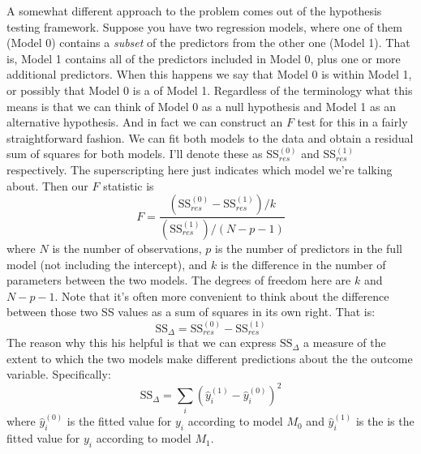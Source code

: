 A somewhat different approach to the problem comes out of the hypothesis testing framework. Suppose you have two regression models, where one of them (Model 0) contains a {\it subset} of the predictors from the other one (Model 1). That is, Model 1 contains all of the predictors included in Model 0, plus one or more additional predictors. When this happens we say that Model 0 is  within Model 1, or possibly that Model 0 is a  of Model 1. Regardless of the terminology what this means is that we can think of Model 0 as a null hypothesis and Model 1 as an alternative hypothesis. And in fact we can construct an $F$ test for this in a fairly straightforward fashion. We can fit both models to the data and obtain a residual sum of squares for both models. I'll denote these as SS$_{res}^{(0)}$ and SS$_{res}^{(1)}$ respectively. The superscripting here just indicates which model we're talking about.  Then our $F$ statistic is
$$
F = \frac{(\mbox{SS}_{res}^{(0)} - \mbox{SS}_{res}^{(1)})/k}{(\mbox{SS}_{res}^{(1)})/(N-p-1)}
$$
where $N$ is the number of observations, $p$ is the number of predictors in the full model (not including the intercept), and $k$ is the difference in the number of parameters between the two models. The degrees of freedom here are $k$ and $N-p-1$. Note that it's often more convenient to think about the difference between those two SS values as a sum of squares in its own right. That is: 
$$
\mbox{SS}_\Delta = \mbox{SS}_{res}^{(0)} - \mbox{SS}_{res}^{(1)}
$$
The reason why this his helpful is that we can express $\mbox{SS}_\Delta$ a measure of the extent to which the two models make different predictions about the the outcome variable. Specifically:
$$
\mbox{SS}_\Delta  = \sum_{i} \left( \hat{y}_i^{(1)} - \hat{y}_i^{(0)} \right)^2
$$
where $\hat{y}_i^{(0)}$ is the fitted value for $y_i$ according to model $M_0$ and  $\hat{y}_i^{(1)}$ is the is the fitted value for $y_i$ according to model $M_1$. 

